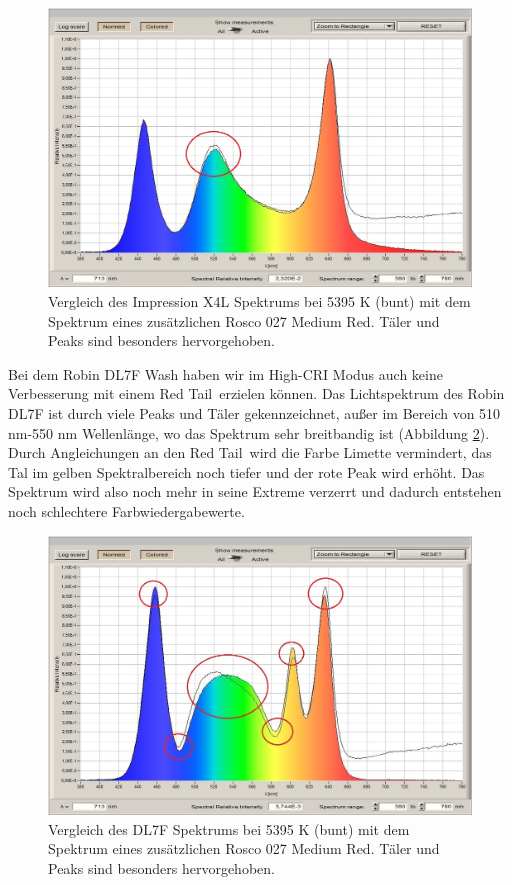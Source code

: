 \begin{figure}[H]     %
\centering
\includegraphics[width=1.0\textwidth]{bilder/glp1} 
\caption {Vergleich des Impression X4L Spektrums bei 5395 K (bunt) mit dem Spektrum eines zusätzlichen Rosco 027 \glqq Medium Red\grqq . Täler und Peaks sind besonders hervorgehoben.}\label{b_impression1}
\end{figure}
\newpage
\noindent Bei dem Robin DL7F Wash haben wir im High-CRI Modus auch keine Verbesserung mit einem \glqq Red Tail\grqq\ erzielen können. Das Lichtspektrum des Robin DL7F ist durch viele Peaks und Täler gekennzeichnet, außer im Bereich von 510 nm-550 nm Wellenlänge, wo das Spektrum sehr breitbandig ist (Abbildung \ref{b_dl7f1}). Durch Angleichungen an den \glqq Red Tail\grqq\ wird die Farbe Limette vermindert, das Tal im gelben Spektralbereich noch tiefer und der rote Peak wird erhöht. Das Spektrum wird also noch mehr in seine Extreme verzerrt und dadurch entstehen noch schlechtere Farbwiedergabewerte.

\begin{figure}[H]     %
\centering
\includegraphics[width=1.0\textwidth]{bilder/dl7f1} 
\caption {Vergleich des DL7F Spektrums bei 5395 K (bunt) mit dem Spektrum eines zusätzlichen Rosco 027 \glqq Medium Red\grqq . Täler und Peaks sind besonders hervorgehoben.}\label{b_dl7f1}
\end{figure}

